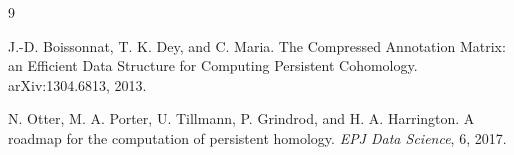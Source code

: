 \documentclass[11pt]{article}
\begin{document}
\begin{thebibliography}{9}

J.-D. Boissonnat, T. K. Dey, and C. Maria.
\newblock The Compressed Annotation Matrix: an Efficient Data Structure for Computing
Persistent Cohomology.
\newblock arXiv:1304.6813, 2013.

N. Otter, M. A. Porter, U. Tillmann, P. Grindrod, and H. A. Harrington.
\newblock A roadmap for the computation of persistent homology.
\newblock \emph{EPJ Data Science}, 6, 2017.

\end{thebibliography}
\end{document}
